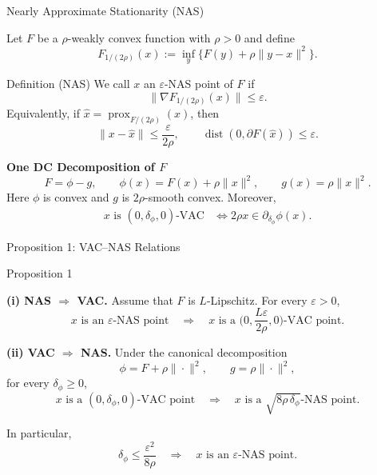 \documentclass[10pt]{beamer}
\begin{document}
\begin{frame}{Nearly Approximate Stationarity (NAS)}
\footnotesize
\vspace{0.2cm}

Let $F$ be a $\rho$-weakly convex function with $\rho>0$ and define
\[
    F_{1/(2\rho)}(x):=\inf_y\{F(y)+\rho\|y-x\|^2\}.
\]

\medskip
\begin{block}{Definition (NAS)\footnotemark}
We call $x$
an $\varepsilon$-NAS point of $F$ if
\[
    \bigl\|\nabla F_{1/(2\rho)}(x)\bigr\|\le \varepsilon.
\]
Equivalently, if $\hat x=\operatorname{prox}_{F/(2\rho)}(x)$, then
\[
    \|x-\hat x\|\le\frac{\varepsilon}{2\rho},
\qquad
    \operatorname{dist} (0, \partial F(\hat x)) \leq \varepsilon.
\]
\end{block}


\medskip
\textbf{One DC Decomposition of $F$}
\[
    F=\phi-g,
    \qquad
    \phi(x)=F(x)+\rho\|x\|^2,
    \qquad
    g(x)=\rho\|x\|^2.
\]
Here $\phi$ is convex and $g$ is $2\rho$-smooth convex. Moreover,
\[
\begin{aligned}
x\text{ is }(0,\delta_\phi,0)\text{-VAC}
&\Longleftrightarrow
2\rho x\in\partial_{\delta_\phi}\phi(x).
\end{aligned}
\]
\end{frame}


\begin{frame}{Proposition 1: VAC--NAS Relations}
\footnotesize

\begin{block}{Proposition 1}
\medskip

\textbf{(i) NAS $\Longrightarrow$ VAC.}
Assume that $F$ is $L$-Lipschitz. For every $\varepsilon>0$,
\[
   x\text{ is an }\varepsilon\text{-NAS point}
   \quad\Longrightarrow\quad
   x\text{ is a }
   \biggl(0,\frac{L\varepsilon}{2\rho},0\biggr)\text{-VAC point}.
\]

\medskip

\textbf{(ii) VAC $\Longrightarrow$ NAS.}
Under the canonical decomposition
\[
   \phi=F+\rho\|\cdot\|^2,
   \qquad
   g=\rho\|\cdot\|^2,
\]
for every $\delta_\phi\ge0$,
\[
   x\text{ is a }(0,\delta_\phi,0)\text{-VAC point}
   \quad\Longrightarrow\quad
   x\text{ is a }\sqrt{8\rho\,\delta_\phi}\text{-NAS point}.
\]

In particular,
\[
   \delta_\phi\le\frac{\varepsilon^2}{8\rho}
   \quad\Longrightarrow\quad
   x\text{ is an }\varepsilon\text{-NAS point}.
\]
\end{block}
\end{frame}
\end{document}
